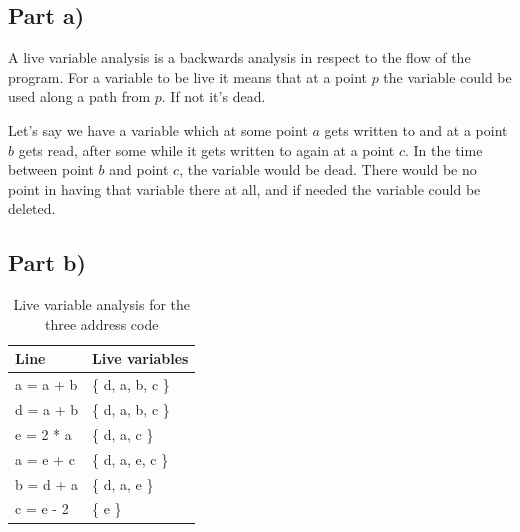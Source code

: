 \documentclass[paper=a4, fontsize=11pt]{scrartcl} %
\numberwithin{equation}{section} %
\numberwithin{figure}{section} %
\numberwithin{table}{section} %
\begin{document}
\subsection{Part a)}
A live variable analysis is a backwards analysis in respect to the flow of the program.
For a variable to be live it means that at a point $p$ the variable could be used along a path from $p$.
If not it's dead.

Let's say we have a variable which at some point $a$ gets written to and at a point $b$ gets read, after some while it gets written to again at a point $c$.
In the time between point $b$ and point $c$, the variable would be dead.
There would be no point in having that variable there at all, and if needed the variable could be deleted.

\newpage
\subsection{Part b)}
\begin{table}[ht!]
    \begin{center}
    \begin{tabular}{|l|l|}
    \hline
    Line      & Live variables \\ \hline
    a = a + b & \{ d, a, b, c \} \\ \hline
    d = a + b & \{ d, a, b, c \} \\ \hline
    e = 2 * a & \{ d, a, c \}  \\ \hline
    a = e + c & \{ d, a, e, c \} \\ \hline
    b = d + a & \{ d, a, e \}  \\ \hline
    c = e - 2 & \{ e \}        \\ \hline
    \end{tabular}
    \caption{Live variable analysis for the three address code}
    \end{center}
\end{table}

\end{document}
